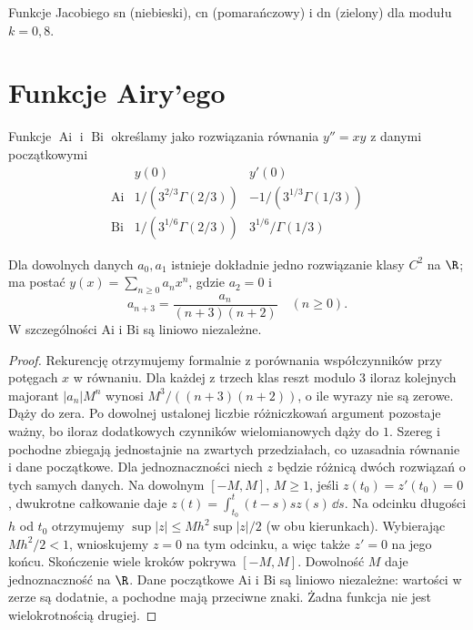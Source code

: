 \begin{center}
\small Funkcje Jacobiego sn (niebieski), cn (pomarańczowy) i dn (zielony) dla modułu $k=0{,}8$.
\end{center}

\section{Funkcje Airy'ego}
\begin{definicja}
\label{ma1:def:airy-real}
Funkcje $\operatorname{Ai}$ i $\operatorname{Bi}$
określamy jako rozwiązania równania $y''=xy$
z danymi początkowymi
\[
 \begin{array}{c|cc}
 &y(0)&y'(0)\\ \hline
 \operatorname{Ai}&1/(3^{2/3}\Gamma(2/3))&
                 -1/(3^{1/3}\Gamma(1/3))\\
 \operatorname{Bi}&1/(3^{1/6}\Gamma(2/3))&
                  3^{1/6}/\Gamma(1/3)
 \end{array}
\]
\end{definicja}
\begin{stwierdzenie}
\label{ma1:prop:airy-series}
Dla dowolnych danych $a_0,a_1$ istnieje dokładnie
jedno rozwiązanie klasy $C^2$ na $\R$; ma postać
$y(x)=\sum_{n\ge0}a_nx^n$, gdzie $a_2=0$ i
\[
 a_{n+3}=\frac{a_n}{(n+3)(n+2)}\quad(n\ge0).
\]
W szczególności Ai i Bi są liniowo niezależne.
\end{stwierdzenie}
\begin{proof}
Rekurencję otrzymujemy formalnie z porównania
współczynników przy potęgach $x$ w równaniu.
Dla każdej z trzech klas reszt modulo $3$ iloraz
kolejnych majorant $|a_n|M^n$ wynosi
$M^3/((n+3)(n+2))$, o ile wyrazy nie są zerowe.
Dąży do zera. Po dowolnej ustalonej liczbie
różniczkowań argument pozostaje ważny, bo
iloraz dodatkowych czynników wielomianowych
dąży do $1$. Szereg i pochodne zbiegają
jednostajnie na zwartych przedziałach, co
uzasadnia równanie i dane początkowe.
Dla jednoznaczności niech $z$ będzie różnicą
dwóch rozwiązań o tych samych danych.
Na dowolnym $[-M,M]$, $M\ge1$, jeśli
$z(t_0)=z'(t_0)=0$, dwukrotne całkowanie daje
$z(t)=\int_{t_0}^t(t-s)s z(s)\,\dd s$.
Na odcinku długości $h$ od $t_0$ otrzymujemy
$\sup|z|\le Mh^2\sup|z|/2$ (w obu kierunkach).
Wybierając $Mh^2/2<1$, wnioskujemy $z=0$
na tym odcinku, a więc także $z'=0$ na jego końcu.
Skończenie wiele kroków pokrywa $[-M,M]$.
Dowolność $M$ daje jednoznaczność na $\R$.
Dane początkowe Ai i Bi są liniowo niezależne:
wartości w zerze są dodatnie, a pochodne mają
przeciwne znaki. Żadna funkcja nie jest
wielokrotnością drugiej.
\end{proof}
